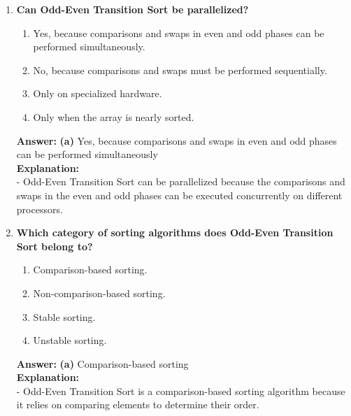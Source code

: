 \begin{enumerate}
    \item \textbf{Can Odd-Even Transition Sort be parallelized?}
    \begin{enumerate}
        \item Yes, because comparisons and swaps in even and odd phases can be performed simultaneously.
        \item No, because comparisons and swaps must be performed sequentially.
        \item Only on specialized hardware.
        \item Only when the array is nearly sorted.
    \end{enumerate}
    \textbf{Answer:} \textbf{(a)} Yes, because comparisons and swaps in even and odd phases can be performed simultaneously \\
    \textbf{Explanation:} \\
    - Odd-Even Transition Sort can be parallelized because the comparisons and swaps in the even and odd phases can be executed concurrently on different processors.

    \item \textbf{Which category of sorting algorithms does Odd-Even Transition Sort belong to?}
    \begin{enumerate}
        \item Comparison-based sorting.
        \item Non-comparison-based sorting.
        \item Stable sorting.
        \item Unstable sorting.
    \end{enumerate}
    \textbf{Answer:} \textbf{(a)} Comparison-based sorting \\
    \textbf{Explanation:} \\
    - Odd-Even Transition Sort is a comparison-based sorting algorithm because it relies on comparing elements to determine their order.
\end{enumerate}